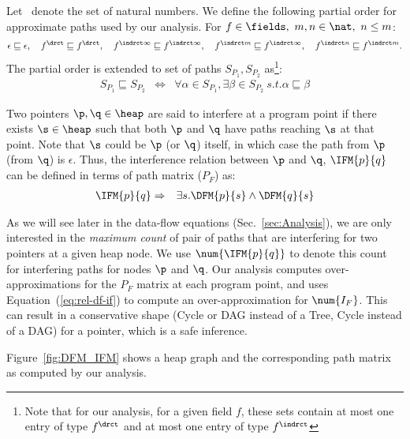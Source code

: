 Let \nat\ denote the set of natural numbers. We define the
following partial order for approximate paths used by our
analysis. For $ f \in \fields,\ m,n \in \nat,\ n \leq m$:
$$
\epsilon \sqsubseteq \epsilon, \quad 
f^\drct \sqsubseteq  f^\drct,  \quad
f^{\indrct\infty}  \sqsubseteq  f^{\indrct\infty}, \quad
f^{\indrct m} \sqsubseteq f^{\indrct\infty}, \quad
f^{\indrct n} \sqsubseteq f^{\indrct m}. 
$$
The partial order is extended to set of paths $S_{P_1},
S_{P_2}$ as\footnote{Note that for our analysis, for a given
  field $f$, these sets contain at most one entry of type
  $f^\drct$ and at most one entry of type $f^\indrct$}:
\begin{eqnarray*}
  S_{P_1} \sqsubseteq S_{P_2} &\Leftrightarrow& \forall \alpha \in
  S_{P_1}, \exists \beta \in S_{P_2}\ s.t. \alpha \sqsubseteq \beta
\end{eqnarray*}

Two pointers  $\p,\q \in  \heap$ are said  to interfere  at a
program point if  there exists $\s \in \heap$  such that both
$\p$ and  $\q$ have paths  reaching $\s$ at that  point. Note
that $\s$ could  be $\p$ (or $\q$) itself,  in which case the
path  from  $\p$  (from   $\q$)  is  $\epsilon$.   Thus,  the
interference  relation between $\p$  and $\q$,  $\IFM{p}{q}$
can be defined in terms of path matrix ($P_F$) as:
\begin{eqnarray}
\IFM{p}{q} &\Rightarrow& \exists s. \DFM{p}{s} \wedge \DFM{q}{s}
\label {eq:rel-df-if}
\end{eqnarray}

As   we   will   see   later  in   the   data-flow   equations
(Sec.~\ref{sec:Analysis}), we are only interested in the {\em
  maximum count}  of pair of  paths that are  interfering for
two pointers at a given heap node.  We use $\num{\IFM{p}{q}}$
to denote this count for interfering paths for nodes $\p$ and
$\q$.   Our  analysis  computes over-approximations  for  the
$P_F$    matrix   at   each    program   point,    and   uses
Equation~(\ref{eq:rel-df-if}) to compute an over-approximation
for  $\num{I_F}$. This  can  result in  a conservative  shape
(Cycle or DAG instead of a  Tree, Cycle instead of a DAG) for
a pointer, which is a safe inference.

\begin{example}{\rm

Figure~\ref{fig:DFM_IFM} shows a heap graph and the
corresponding path matrix as computed by our
analysis.} \hfill\psframebox{}
\end{example}

